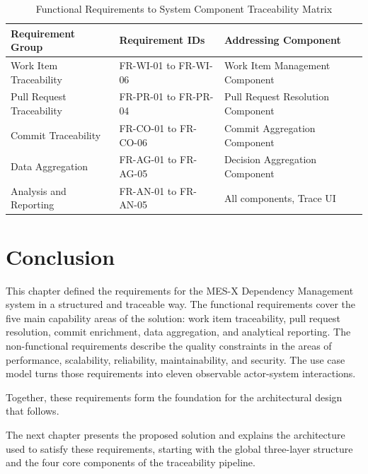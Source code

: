 \begin{table}[H]
  \centering
  \caption{Functional Requirements to System Component Traceability Matrix}
  \label{tab:req-traceability}
  \begin{tabular}{|p{4.5cm}|p{3cm}|p{5.5cm}|}
    \hline
    \textbf{Requirement Group} & \textbf{Requirement IDs} & \textbf{Addressing Component} \\
    \hline
    Work Item Traceability & FR-WI-01 to FR-WI-06 & Work Item Management Component \\
    \hline
    Pull Request Traceability & FR-PR-01 to FR-PR-04 & Pull Request Resolution Component \\
    \hline
    Commit Traceability & FR-CO-01 to FR-CO-06 & Commit Aggregation Component \\
    \hline
    Data Aggregation & FR-AG-01 to FR-AG-05 & Decision Aggregation Component \\
    \hline
    Analysis and Reporting & FR-AN-01 to FR-AN-05 & All components, Trace UI \\
    \hline
  \end{tabular}
\end{table}

\section{Conclusion}
\label{sec:req-conclusion}

This chapter defined the requirements for the MES-X Dependency Management
system in a structured and traceable way. The functional requirements cover the
five main capability areas of the solution: work item traceability, pull
request resolution, commit enrichment, data aggregation, and analytical
reporting. The non-functional requirements describe the quality constraints in
the areas of performance, scalability, reliability, maintainability, and
security. The use case model turns those requirements into eleven observable
actor-system interactions.

Together, these requirements form the foundation for the architectural design
that follows.

The next chapter presents the proposed solution and explains the architecture
used to satisfy these requirements, starting with the global three-layer
structure and the four core components of the traceability pipeline.
